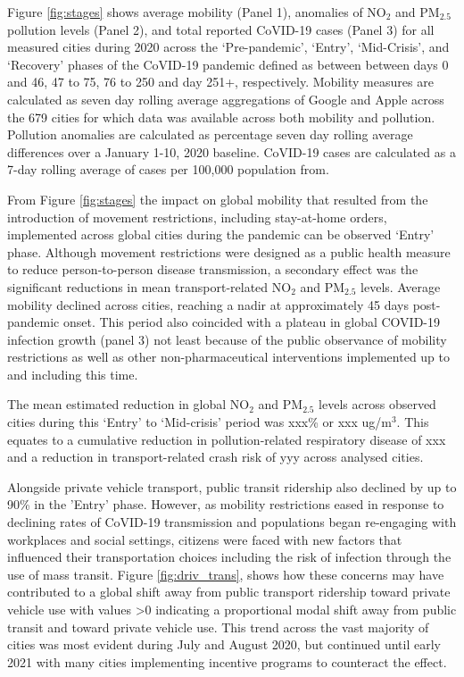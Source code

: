 \documentclass[preprint,12pt]{elsarticle}
\begin{document}
Figure \ref{fig:stages} shows average mobility (Panel 1), anomalies of NO$_{2}$ and PM$_{2.5}$ pollution levels (Panel 2), and total reported CoVID-19 cases (Panel 3) for all measured cities during 2020 across the `Pre-pandemic', `Entry', `Mid-Crisis', and `Recovery' phases of the CoVID-19 pandemic defined as between between days 0 and 46, 47 to 75, 76 to 250 and day 251+, respectively. Mobility measures are calculated as seven day rolling average aggregations of Google and Apple across the 679 cities for which data was available across both mobility and pollution. Pollution anomalies are calculated as percentage seven day rolling average differences over a January 1-10, 2020 baseline. CoVID-19 cases are calculated as a 7-day rolling average of cases per 100,000 population from\cite{Google2022}.

From Figure \ref{fig:stages} the  impact on global mobility that resulted from the introduction of movement restrictions, including stay-at-home orders, implemented across global cities during the pandemic can be observed `Entry' phase\cite{hale2021global}. Although movement restrictions were designed as a public health measure to reduce person-to-person disease transmission, a secondary effect was the significant reductions in mean transport-related NO$_{2}$ and PM$_{2.5}$ levels\cite{zhang2023impact}. Average mobility declined across cities, reaching a nadir at approximately 45 days post-pandemic onset. This period also coincided with a plateau in global COVID-19 infection growth (panel 3) not least because of the public observance of mobility restrictions as well as other non-pharmaceutical interventions implemented up to and including this time\cite{hale2021global}. 

The mean estimated reduction in global NO$_{2}$ and PM$_{2.5}$ levels across observed cities during this `Entry' to `Mid-crisis' period was xxx\% or xxx ug/m$^{3}$. This equates to a cumulative reduction in pollution-related respiratory disease of xxx and a reduction in transport-related crash risk of yyy across analysed cities.

Alongside private vehicle transport, public transit ridership also declined by up to 90\% in the 'Entry' phase\cite{TransitCovid_Gkiotsalitis}. However, as mobility restrictions eased in response to declining rates of CoVID-19 transmission and populations began re-engaging with workplaces and social settings, citizens were faced with new factors that influenced their transportation choices including the risk of infection through the use of mass transit\cite{BECKTransit}. Figure \ref{fig:driv_trans}, shows how these concerns may have contributed to a global shift away from public transport ridership toward private vehicle use with values \textgreater 0 indicating a proportional modal shift away from public transit and toward private vehicle use. This trend across the vast majority of cities was most evident during July and August 2020, but continued until early 2021 with many cities implementing incentive programs to counteract the effect\cite{dai2021improving}.
\end{document}
